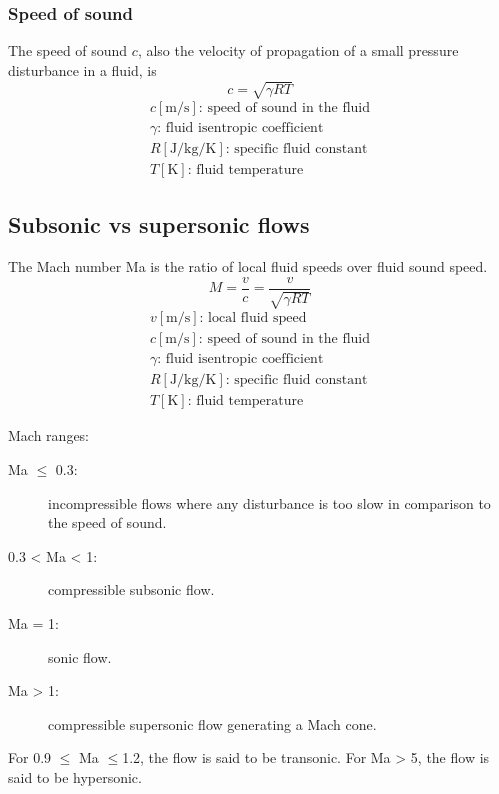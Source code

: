\documentclass[10pt, twocolumn]{article}
\begin{document}
\subsubsection{Speed of sound}
The speed of sound \(c\), also the velocity of propagation of a small pressure disturbance in a fluid, is
\[
  c = \sqrt{\gamma R T}
\]
\[
  \begin{array}{|l}
    c [\si{\metre\per\second}] \text{: speed of sound in the fluid}          \\
    \gamma \text{: fluid isentropic coefficient}                             \\
    R [\si{\joule\per\kilogram\per\kelvin}] \text{: specific fluid constant} \\
    T [\si{\kelvin}] \text{: fluid temperature}
  \end{array}
\]


\subsection{Subsonic vs supersonic flows}
The Mach number Ma is the ratio of local fluid speeds over fluid sound speed.
\[
  M = \frac{v}{c} = \frac{v}{\sqrt{\gamma R T}}
\]
\[
  \begin{array}{|l}
    v [\si{\metre\per\second}] \text{: local fluid speed}                    \\
    c [\si{\metre\per\second}] \text{: speed of sound in the fluid}          \\
    \gamma \text{: fluid isentropic coefficient}                             \\
    R [\si{\joule\per\kilogram\per\kelvin}] \text{: specific fluid constant} \\
    T [\si{\kelvin}] \text{: fluid temperature}
  \end{array}
\]


Mach ranges:
\begin{description}
  \item[Ma \(\leqslant\) 0.3: ] incompressible flows where any disturbance is too slow in comparison to the speed of sound.
  \item[0.3 < Ma < 1: ] compressible subsonic flow.
  \item[Ma = 1: ] sonic flow.
  \item[Ma > 1: ] compressible supersonic flow generating a Mach cone.
\end{description}

\begin{remark}
  For 0.9 \(\leqslant\) Ma \(\leqslant\)1.2, the flow is said to be transonic.
  For Ma > 5, the flow is said to be hypersonic.
\end{remark}
\end{document}
